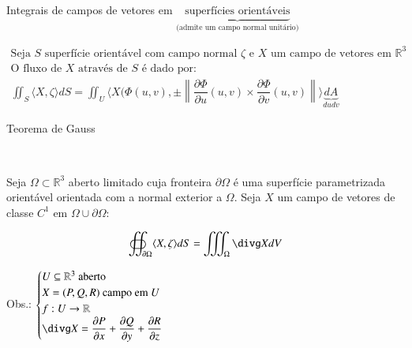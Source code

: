 \begin{large}
Integrais de campos de vetores em $\underbrace{\text{superfícies orientáveis}}_{\text{(admite um campo normal unitário)}}$
\end{large}

\begin{gather*}\text{
Seja $S$ superfície orientável com campo normal $\zeta$ e $X$ um campo de vetores em $\mathbb{R}^3$} \\
\text{O fluxo de $X$ através de $S$ é dado por}: \\
\displaystyle\iint_S\langle X,\zeta \rangle dS = \displaystyle\iint_U \langle X(\Phi(u,v), \pm \left\lVert \dfrac{\partial \Phi}{\partial u}(u,v) \times \dfrac{\partial \Phi}{\partial v}(u,v)\right\rVert \rangle \underbrace{dA}_{dudv}
\end{gather*}

\begin{large}
Teorema de Gauss
\end{large}\vspace{12pt}\\
\null\hspace{48pt} \begin{minipage}{\dimexpr\textwidth-30\fboxsep-2\fboxrule\relax}
Seja $\Omega \subset \mathbb{R}^3$ aberto limitado cuja fronteira $\partial\Omega$ é uma superfície parametrizada orientável orientada com a normal exterior a $\Omega$. Seja $X$ um campo de vetores de classe $C^1$ em $\Omega \cup \partial\Omega$:
\end{minipage}

\begin{gather*}
\displaystyle\oiint_{\partial\Omega} \langle X, \zeta \rangle dS = \displaystyle\iiint_{\Omega} \divg X dV
\end{gather*}

\null\hspace{48pt}Obs.: $\begin{cases} U \subseteq \mathbb{R}^3 \text{ aberto} \\ X=(P,Q,R) \text{ campo em } U\\
f:U\to\mathbb{R}\\ \divg X = \dfrac{\partial P}{\partial x} +\dfrac{\partial Q}{\partial y}+\dfrac{\partial R}{\partial z}\end{cases}$

\begin{center}
\end{center}

